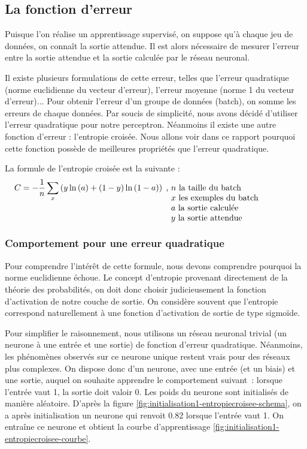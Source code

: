 \subsection{La fonction d'erreur}

Puisque l'on réalise un apprentissage supervisé, on suppose qu'à chaque jeu de données, on connaît la sortie attendue. Il est alors nécessaire
de mesurer l'erreur entre la sortie attendue et la sortie calculée par le réseau neuronal.

Il existe plusieurs formulations de cette erreur, telles que l'erreur quadratique (norme euclidienne du vecteur d'erreur), l'erreur moyenne (norme 1 du vecteur d'erreur)... 
Pour obtenir l'erreur d'un groupe de données (batch), on somme les erreurs de chaque données. Par soucis de simplicité, nous avons décidé d'utiliser
l'erreur quadratique pour notre perceptron. Néanmoins il existe une autre fonction d'erreur : l'entropie croisée. Nous allons voir dans ce rapport pourquoi 
cette fonction possède de meilleures propriétés que l'erreur quadratique.

La formule de l'entropie croisée est la suivante : 
\begin{equation}
 C = -\frac{1}{n}\sum_x\left(y\ln\left(a\right) + \left(1-y\right)\ln\left(1-a\right)\right)\; \text{, \parbox[t]{15em}{$n$ la taille du batch\\ $x$ les exemples du batch\\
 $a$ la sortie calculée\\$y$ la sortie attendue}}
 \label{eq:formule-entropiecroisee}
\end{equation}

\subsubsection{Comportement pour une erreur quadratique}

Pour comprendre l'intérêt de cette formule, nous devons comprendre pourquoi la norme euclidienne échoue. Le concept d'entropie provenant 
directement de la théorie des probabilités, on doit donc choisir judicieusement la fonction d'activation de notre couche de sortie. On 
considère souvent que l'entropie correspond naturellement à une fonction d'activation de sortie de type sigmoïde. 

Pour simplifier le raisonnement, nous utilisons un réseau neuronal trivial (un neurone à une entrée et une sortie) de fonction d'erreur quadratique. 
Néanmoins, les phénomènes observés sur ce neurone unique restent vrais pour des réseaux plus complexes. On dispose donc d'un neurone, avec une entrée (et un biais) et 
une sortie, auquel on souhaite apprendre le comportement suivant~: lorsque l'entrée vaut 1, la sortie doit valoir 0.
Les poids du neurone sont initialisés de manière aléatoire. D'après la figure \ref{fig:initialisation1-entropiecroisee-schema}, on a après initialisation 
un neurone qui renvoit 0.82 lorsque l'entrée vaut 1. On entraîne ce neurone et obtient la courbe d'apprentissage 
\ref{fig:initialisation1-entropiecroisee-courbe}.


